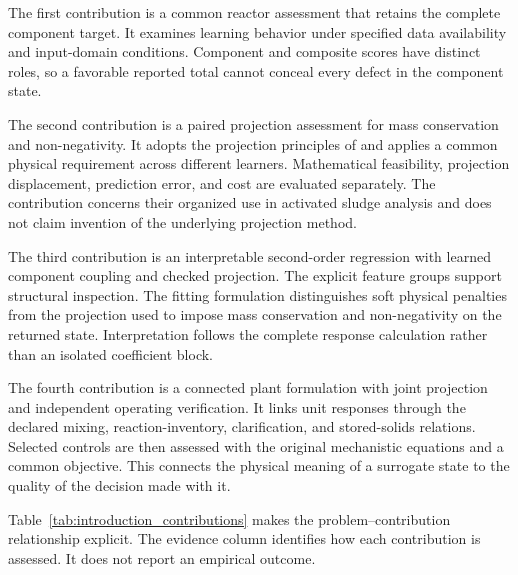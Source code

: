The first contribution is a common reactor assessment that retains the complete component target. It examines learning behavior under specified data availability and input-domain conditions. Component and composite scores have distinct roles, so a favorable reported total cannot conceal every defect in the component state.

The second contribution is a paired projection assessment for mass conservation and non-negativity. It adopts the projection principles of \citet{KircherVotsmeier2025} and applies a common physical requirement across different learners. Mathematical feasibility, projection displacement, prediction error, and cost are evaluated separately. The contribution concerns their organized use in activated sludge analysis and does not claim invention of the underlying projection method.

The third contribution is an interpretable second-order regression with learned component coupling and checked projection. The explicit feature groups support structural inspection. The fitting formulation distinguishes soft physical penalties from the projection used to impose mass conservation and non-negativity on the returned state. Interpretation follows the complete response calculation rather than an isolated coefficient block.

The fourth contribution is a connected plant formulation with joint projection and independent operating verification. It links unit responses through the declared mixing, reaction-inventory, clarification, and stored-solids relations. Selected controls are then assessed with the original mechanistic equations and a common objective. This connects the physical meaning of a surrogate state to the quality of the decision made with it.

Table~\ref{tab:introduction_contributions} makes the problem--contribution relationship explicit. The evidence column identifies how each contribution is assessed. It does not report an empirical outcome.


